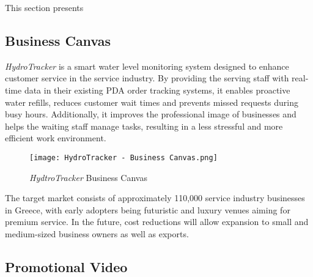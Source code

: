This section presents 

\subsection{Business Canvas}

\textit{HydroTracker} is a smart water level monitoring system designed to enhance customer service in the service industry. By providing the serving staff with real-time data in their existing PDA order tracking systems, it enables proactive water refills, reduces customer wait times and prevents missed requests during busy hours. Additionally, it improves the professional image of businesses and helps the waiting staff manage tasks, resulting in a less stressful and more efficient work environment.
\begin{figure}[H]
    \centering
    \texttt{[image: HydroTracker - Business Canvas.png]}
    \caption{\textit{HydtroTracker} Business Canvas}
    \label{fig:enter-label}
\end{figure}

The target market consists of approximately 110,000 service industry businesses in Greece, with early adopters being futuristic and luxury venues aiming for premium service. In the future, cost reductions will allow expansion to small and medium-sized business owners as well as exports.

 

\subsection{Promotional Video}